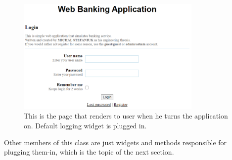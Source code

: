 \documentclass[a4paper,12pt]{book}
\begin{document}
{\begin{figure}[H]
\centering
\includegraphics[width=0.8\textwidth]{logpage}
\caption{This is the page that renders to user when he turns the application on. Default logging widget is plugged in.}
\end{figure}  

Other members of this class are just widgets and methods responsible for plugging them-in, which is the topic of the next section.
}
\end{document}
